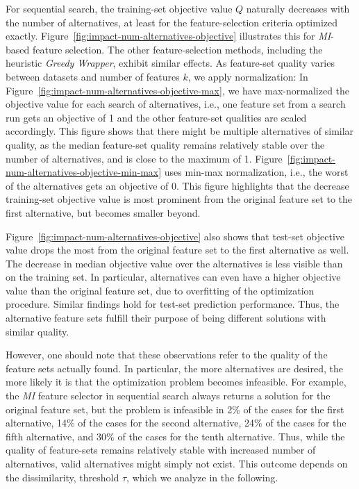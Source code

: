 \documentclass[conference]{IEEEtran}
\theoremstyle{definition}
\begin{document}
For sequential search, the training-set objective value $Q$ naturally decreases with the number of alternatives, at least for the feature-selection criteria optimized exactly.
Figure~\ref{fig:impact-num-alternatives-objective} illustrates this for \emph{MI}-based feature selection.
The other feature-selection methods, including the heuristic \emph{Greedy Wrapper}, exhibit similar effects.
As feature-set quality varies between datasets and number of features $k$, we apply normalization:
In Figure~\ref{fig:impact-num-alternatives-objective-max}, we have max-normalized the objective value for each search of alternatives, i.e., one feature set from a search run gets an objective of 1 and the other feature-set qualities are scaled accordingly.
This figure shows that there might be multiple alternatives of similar quality, as the median feature-set quality remains relatively stable over the number of alternatives, and is close to the maximum of 1.
Figure~\ref{fig:impact-num-alternatives-objective-min-max} uses min-max normalization, i.e., the worst of the alternatives gets an objective of 0.
This figure highlights that the decrease training-set objective value is most prominent from the original feature set to the first alternative, but becomes smaller beyond.

Figure~\ref{fig:impact-num-alternatives-objective} also shows that test-set objective value drops the most from the original feature set to the first alternative as well.
The decrease in median objective value over the alternatives is less visible than on the training set.
In particular, alternatives can even have a higher objective value than the original feature set, due to overfitting of the optimization procedure.
Similar findings hold for test-set prediction performance.
Thus, the alternative feature sets fulfill their purpose of being different solutions with similar quality.

However, one should note that these observations refer to the quality of the feature sets actually found.
In particular, the more alternatives are desired, the more likely it is that the optimization problem becomes infeasible.
For example, the \emph{MI} feature selector in sequential search always returns a solution for the original feature set, but the problem is infeasible in 2\% of the cases for the first alternative, 14\% of the cases for the second alternative, 24\% of the cases for the fifth alternative, and 30\% of the cases for the tenth alternative.
Thus, while the quality of feature-sets remains relatively stable with increased number of alternatives, valid alternatives might simply not exist.
This outcome depends on the dissimilarity, threshold $\tau$, which we analyze in the following.
\end{document}
